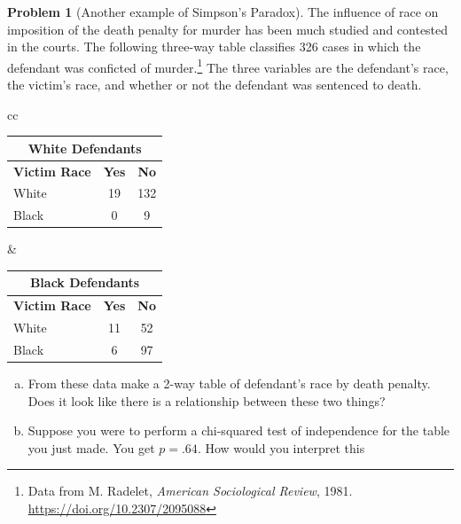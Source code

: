 \documentclass[10pt]{amsart}
\theoremstyle{definition}
\newtheorem{problem}[theorem]{Problem}
\newcommand{\1}[1]{\textbf{1}_{\left[#1\right]}} %
\begin{document}
\newpage
\begin{problem}[Another example of Simpson's Paradox]
  The influence of race on imposition of the death penalty for murder has been
  much studied and contested in the courts. The following three-way table
  classifies 326 cases in which the defendant was conficted of
  murder.\footnote{Data from M. Radelet, \textit{American Sociological Review}, 1981.
    \url{https://doi.org/10.2307/2095088}} The three variables are the
  defendant's race, the victim's race, and whether or not the defendant was
  sentenced to death.
  \vspace{.5em}
  \begin{center}
    \begin{tabular}{cc}
      \begin{tabular}{lcc}
        \multicolumn{3}{c}{\textbf{White Defendants}} \\ \hline
        \textbf{Victim Race} & \textbf{Yes} & \textbf{No} \\ \hline
        White & 19 & 132 \\
        Black & 0  & 9   \\ \hline
      \end{tabular}
                            \quad \quad \quad \quad &
                               \begin{tabular}{lcc}
                                 \multicolumn{3}{c}{\textbf{Black Defendants}} \\ \hline
                                 \textbf{Victim Race} & \textbf{Yes} & \textbf{No} \\ \hline
                                 White & 11 & 52  \\
                                 Black & 6  & 97  \\ \hline
                               \end{tabular}
    \end{tabular}
  \end{center}
  \vspace{2em}
  \begin{enumerate}[(a)]
    \setlength{\itemsep}{7em}
    \item From these data make a 2-way table of defendant's race by death
    penalty. Does it look like there is a relationship between these two
    things?
    \vspace{1cm}
    \item Suppose you were to perform a chi-squared test of independence for
    the table you just made. You get $p=.64$. How would you interpret this

\end{enumerate}
\end{problem}
\end{document}
